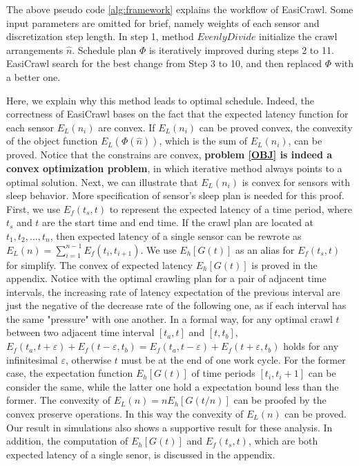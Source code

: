 \documentclass[conference]{IEEEtran}
\begin{document}
The above pseudo code \ref{alg:framework} explains the workflow of EasiCrawl. 
Some input parameters are omitted for brief, namely weights of each sensor and discretization step length.
In step 1, method $EvenlyDivide$ initialize the crawl arrangements $\hat{n}$. 
Schedule plan $\Phi$ is iteratively improved during steps 2 to 11. 
EasiCrawl search for the best change from Step 3 to 10, and then replaced $\Phi$ with a better one.

Here, we explain why this method leads to optimal schedule.
Indeed, the correctness of EasiCrawl bases on the fact that the expected latency function for each sensor $E_L(n_i)$ are convex. 
If $E_L(n_i)$ can be proved convex, the convexity of the object function $E_L(\Phi(\hat{n}))$, which is the sum of $E_L(n_i)$, can be proved.
Notice that the constrains are convex, \textbf{problem \eqref{OBJ} is indeed a convex optimization problem}, in which iterative method always points to a optimal solution.
Next, we can illustrate that $E_L(n_i)$ is convex for sensors with sleep behavior.
More specification of sensor's sleep plan is needed for this proof.
First, we use $E_f(t_s,t)$ to represent the expected latency of a time period, where $t_s$ and $t$ are the start time and end time. 
If the crawl plan are located at $t_1,t_2,...,t_n$, then expected latency of a single sensor can be rewrote as $E_L(n) = \sum_{i=1}^{n-1}E_f(t_{i},t_{i+1})$. 
We use $E_h[G(t)]$ as an alias for $E_f(t_s,t)$ for simplify.
The convex of expected latency $E_h[G(t)]$ is proved in the appendix. 
Notice with the optimal crawling plan for a pair of adjacent time intervals, the increasing rate of latency expectation of the previous interval are just the negative of the decrease rate of the following one, as if each interval has the same "pressure" with one another.
In a formal way, for any optimal crawl $t$ between two adjacent time interval $[t_a,t]$ and $[t,t_b]$, $E_f(t_a,t+\varepsilon)+E_f(t-\varepsilon,t_b) = E_f(t_a,t-\varepsilon)+E_f(t+\varepsilon,t_b)$ holds for any infinitesimal $\varepsilon$, otherwise $t$ must be at the end of one work cycle.
For the former case, the expectation function $E_h[G(t)]$ of time periods $[t_i,t_i+1]$ can be consider the same, while the latter one hold a expectation bound less than the former.
The convexity of $E_L(n) = n E_h[G(t/n)]$ can be proofed by the convex preserve operations\cite{boyd2004convex}. 
In this way the convexity of $E_L(n)$ can be proved.
Our result in simulations also shows a supportive result for these analysis.
In addition, the computation of $E_h[G(t)]$ and $E_f(t_s,t)$, which are both expected latency of a single senor, is discussed in the appendix.
\end{document}
